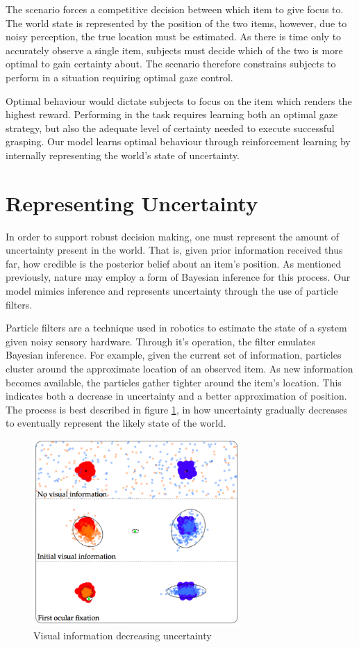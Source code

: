 \documentclass[11]{article}
\begin{document}
The scenario forces a competitive decision between which item to give focus to. 
The world state is represented by the position of the two items, however, due to noisy perception, the true location must be estimated.
As there is time only to accurately observe a single item, subjects must decide which of the two is more optimal to gain certainty about. 
The scenario therefore constrains subjects to perform in a situation requiring optimal gaze control. 

Optimal behaviour would dictate subjects to focus on the item which renders the highest reward. 
Performing in the task requires learning both an optimal gaze strategy, but also the adequate level of certainty needed to execute successful grasping.  
Our model learns optimal behaviour through reinforcement learning by internally representing the world's state of uncertainty. 


\section{Representing Uncertainty}
In order to support robust decision making, one must represent the amount of uncertainty present in the world. 
That is, given prior information received thus far, how credible is the posterior belief about an item's position. 
As mentioned previously, nature may employ a form of Bayesian inference for this process.
Our model mimics inference and represents uncertainty through the use of particle filters. 

Particle filters are a technique used in robotics to estimate the state of a system given noisy sensory hardware.
Through it's operation, the filter emulates Bayesian inference.   
For example, given the current set of information, particles cluster around the approximate location of an observed item.
As new information becomes available, the particles gather tighter around the item's location.
This indicates both a decrease in uncertainty and a better approximation of position. 
The process is best described in figure \ref{fig:uncertainty}, in how uncertainty gradually decreases to eventually represent the likely state of the world. 

\begin{figure}[h]
	\centering
	\includegraphics[width=0.7\textwidth]{figures/uncertainty.png}
	\caption{Visual information decreasing uncertainty}
	\label{fig:uncertainty}
\end{figure}
\end{document}
